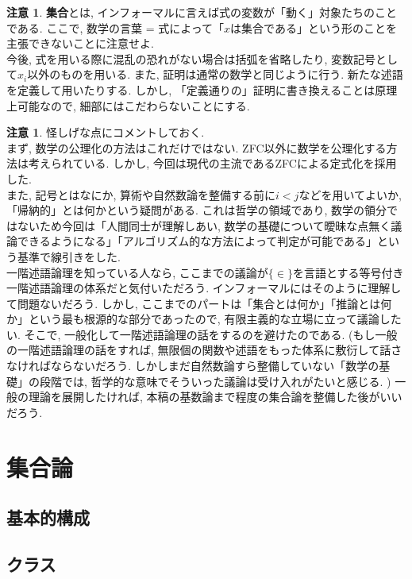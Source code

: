 \documentclass[a4paper]{bxjsarticle}
\theoremstyle{definition}
\newtheorem{rem}[thm]{注意}
\begin{document}
        \begin{rem}
            \textbf{集合}とは, インフォーマルに言えば式の変数が「動く」対象たちのことである. ここで, 数学の言葉 = 式によって「$x$は集合である」という形のことを主張できないことに注意せよ.\\
            今後, 式を用いる際に混乱の恐れがない場合は括弧を省略したり, 変数記号として$x_i$以外のものを用いる. また, 証明は通常の数学と同じように行う. 新たな述語を定義して用いたりする. しかし, 「定義通りの」証明に書き換えることは原理上可能なので, 細部にはこだわらないことにする.
        \end{rem}
        \begin{rem}
        怪しげな点にコメントしておく.\\
        まず, 数学の公理化の方法はこれだけではない. ZFC以外に数学を公理化する方法は考えられている. しかし, 今回は現代の主流であるZFCによる定式化を採用した.\\
        また, 記号とはなにか, 算術や自然数論を整備する前に$i < j$などを用いてよいか, 「帰納的」とは何かという疑問がある. これは哲学の領域であり, 数学の領分ではないため今回は「人間同士が理解しあい, 数学の基礎について曖昧な点無く議論できるようになる」「アルゴリズム的な方法によって判定が可能である」という基準で線引きをした.\\
        一階述語論理を知っている人なら, ここまでの議論が$\{ \in \}$を言語とする等号付き一階述語論理の体系だと気付いただろう. インフォーマルにはそのように理解して問題ないだろう. しかし, ここまでのパートは「集合とは何か」「推論とは何か」という最も根源的な部分であったので, 有限主義的な立場に立って議論したい. そこで, 一般化して一階述語論理の話をするのを避けたのである. (もし一般の一階述語論理の話をすれば, 無限個の関数や述語をもった体系に敷衍して話さなければならないだろう. しかしまだ自然数論すら整備していない「数学の基礎」の段階では, 哲学的な意味でそういった議論は受け入れがたいと感じる. ) 一般の理論を展開したければ, 本稿の基数論まで程度の集合論を整備した後がいいだろう.
        \end{rem}

    \newpage
    \section{集合論}
    \subsection{基本的構成}
    \subsection{クラス}
\end{document}
